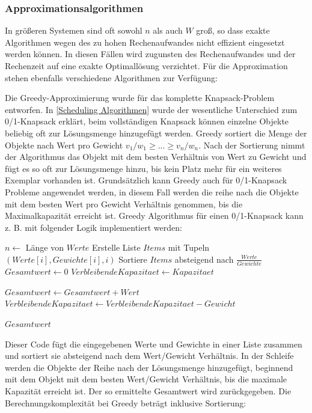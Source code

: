 \subsubsection{Approximationsalgorithmen}
\label{Approximationsalgorithmen}

In größeren Systemen sind oft sowohl $ n $ als auch $ W $ groß, so dass exakte Algorithmen wegen des zu hohen Rechenaufwandes nicht effizient eingesetzt werden können. In diesen Fällen wird zugunsten des Rechenaufwandes und der Rechenzeit auf eine exakte Optimallösung verzichtet. Für die Approximation stehen ebenfalls verschiedene Algorithmen zur Verfügung:

Die Greedy-Approximierung wurde für das komplette Knapsack-Problem entworfen. In \autoref{Scheduling Algorithmen} wurde der wesentliche Unterschied zum 0/1-Knapsack erklärt, beim vollständigen Knapsack können einzelne Objekte beliebig oft zur Lösungsmenge hinzugefügt werden. Greedy sortiert die Menge der Objekte nach Wert pro Gewicht $ v_1 / w_1 \geq ... \geq v_n / w_n $. Nach der Sortierung nimmt der Algorithmus das Objekt mit dem besten Verhältnis von Wert zu Gewicht und fügt es so oft zur Lösungsmenge hinzu, bis kein Platz mehr für ein weiteres Exemplar vorhanden ist. Grundsätzlich kann Greedy auch für 0/1-Knapsack Probleme angewendet werden, in diesem Fall werden die reihe nach die Objekte mit dem besten Wert pro Gewicht Verhältnis genommen, bis die Maximalkapazität erreicht ist. Greedy Algorithmus für einen 0/1-Knapsack kann z. B. mit folgender Logik implementiert werden:

\begin{algorithmic}
    \State $n \leftarrow$ Länge von $Werte$
    \State Erstelle Liste $Items$ mit Tupeln $(Werte[i], Gewichte[i], i)$
    \State Sortiere $Items$ absteigend nach $\frac{Werte}{Gewichte}$
    \State $Gesamtwert \leftarrow 0$
    \State $VerbleibendeKapazitaet \leftarrow Kapazitaet$

            \State $Gesamtwert \leftarrow Gesamtwert + Wert$
            \State $VerbleibendeKapazitaet \leftarrow VerbleibendeKapazitaet - Gewicht$
        \EndIf
    \EndFor

    \State \Return $Gesamtwert$
    \EndFunction
\end{algorithmic}

Dieser Code fügt die eingegebenen Werte und Gewichte in einer Liste zusammen und sortiert sie absteigend nach dem Wert/Gewicht Verhältnis. In der Schleife werden die Objekte der Reihe nach der Lösungsmenge hinzugefügt, beginnend mit dem Objekt mit dem besten Wert/Gewicht Verhältnis, bis die maximale Kapazität erreicht ist. Der so ermittelte Gesamtwert wird zurückgegeben. Die Berechnungskomplexität bei Greedy beträgt inklusive Sortierung:

